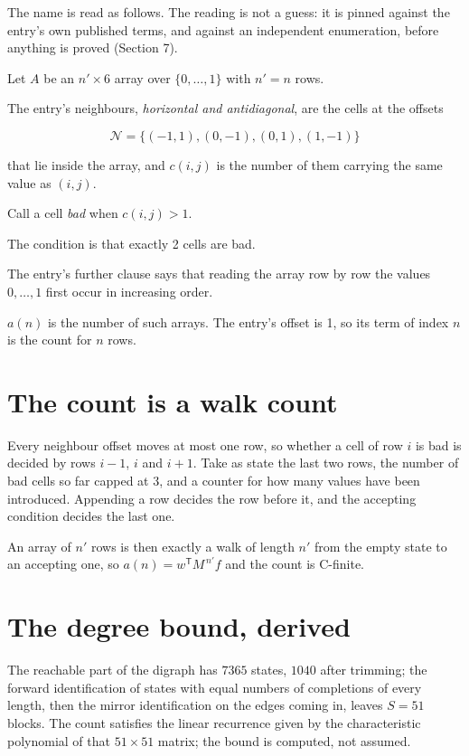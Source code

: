 \documentclass[11pt]{article}
\theoremstyle{definition}
\begin{document}
The name is read as follows. The reading is not a guess: it is pinned against the entry's own published terms, and against an independent enumeration, before anything is proved (Section 7).

Let $A$ be an $n' \times 6$ array over $\{0,\dots,1\}$ with $n' = n$ rows.

The entry's neighbours, {\itshape horizontal and antidiagonal}, are the cells at the offsets

\[\mathcal{N} = \{(-1,1), (0,-1), (0,1), (1,-1)\}\]

that lie inside the array, and $c(i,j)$ is the number of them carrying the same value as $(i,j)$.

Call a cell {\itshape bad} when $c(i,j) > 1$.

The condition is that exactly 2 cells are bad.

The entry's further clause says that reading the array row by row the values $0,\dots,1$ first occur in increasing order.

$a(n)$ is the number of such arrays. The entry's offset is 1, so its term of index $n$ is the count for $n$ rows.

\section{The count is a walk count}

Every neighbour offset moves at most one row, so whether a cell of row $i$ is bad is decided by rows $i-1$, $i$ and $i+1$. Take as state the last two rows, the number of bad cells so far capped at 3, and a counter for how many values have been introduced. Appending a row decides the row before it, and the accepting condition decides the last one.

An array of $n'$ rows is then exactly a walk of length $n'$ from the empty state to an accepting one, so $a(n) = w^{\mathsf T}M^{\,n'}f$ and the count is C-finite.

\section{The degree bound, derived}

The reachable part of the digraph has $7365$ states, $1040$ after trimming; the forward identification of states with equal numbers of completions of every length, then the mirror identification on the edges coming in, leaves $S = 51$ blocks. The count satisfies the linear recurrence given by the characteristic polynomial of that $51\times51$ matrix; the bound is computed, not assumed.
\end{document}
